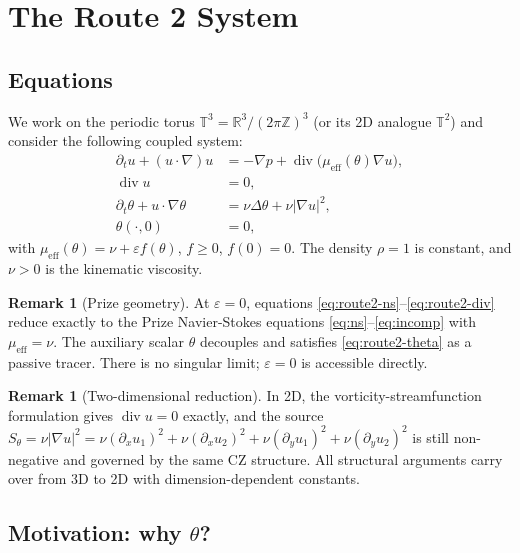 \documentclass[11pt]{article}
\theoremstyle{definition}
\newtheorem{remark}[theorem]{Remark}
\newcommand{\R}{\mathbb{R}}
\newcommand{\T}{\mathbb{T}}
\newcommand{\Z}{\mathbb{Z}}
\newcommand{\abs}[1]{\left|#1\right|}
\newcommand{\grad}{\nabla}
\newcommand{\divg}{\operatorname{div}}
\newcommand{\eps}{\varepsilon}
\newcommand{\thetafield}{\theta}
\newcommand{\mueff}{\mu_{\mathrm{eff}}}
\begin{document}
\section{The Route 2 System}
\label{sec:system}

\subsection{Equations}

We work on the periodic torus $\T^3 = \R^3 / (2\pi\Z)^3$ (or its 2D analogue
$\T^2$) and consider the following coupled system:
\begin{align}
  \partial_t u + (u \cdot \grad) u
    &= -\grad p + \divg\!\bigl(\mueff(\thetafield) \grad u\bigr), \label{eq:route2-ns}\\
  \divg u &= 0, \label{eq:route2-div}\\
  \partial_t \thetafield + u \cdot \grad \thetafield
    &= \nu \Delta \thetafield + \nu \abs{\grad u}^2, \label{eq:route2-theta}\\
  \thetafield(\cdot, 0) &= 0, \label{eq:route2-IC}
\end{align}
with $\mueff(\thetafield) = \nu + \eps f(\thetafield)$, $f \geq 0$, $f(0) = 0$.
The density $\rho = 1$ is constant, and $\nu > 0$ is the kinematic viscosity.

\begin{remark}[Prize geometry]
At $\eps = 0$, equations \eqref{eq:route2-ns}--\eqref{eq:route2-div} reduce exactly to
the Prize Navier-Stokes equations \eqref{eq:ns}--\eqref{eq:incomp}
with $\mueff = \nu$. The auxiliary scalar $\thetafield$ decouples and satisfies
\eqref{eq:route2-theta} as a passive tracer. There is no singular limit; $\eps = 0$
is accessible directly.
\end{remark}

\begin{remark}[Two-dimensional reduction]
In 2D, the vorticity-streamfunction formulation gives $\divg u = 0$ exactly, and
the source $S_\theta = \nu \abs{\grad u}^2 = \nu (\partial_x u_1)^2 + \nu(\partial_x u_2)^2 +
\nu(\partial_y u_1)^2 + \nu(\partial_y u_2)^2$ is still non-negative and governed by
the same CZ structure. All structural arguments carry over from 3D to 2D with
dimension-dependent constants.
\end{remark}

\subsection{Motivation: why $\theta$?}
\end{document}
